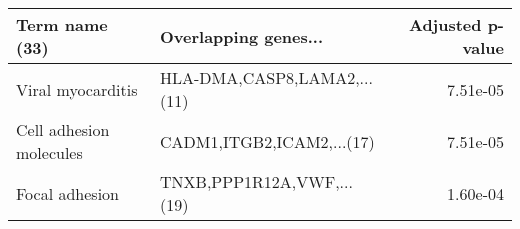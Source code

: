 \begin{tabular}{llr}
\toprule
         Term name (33) &        Overlapping genes... &  Adjusted p-value \\
\midrule
      Viral myocarditis & HLA-DMA,CASP8,LAMA2,...(11) &          7.51e-05 \\
Cell adhesion molecules &   CADM1,ITGB2,ICAM2,...(17) &          7.51e-05 \\
         Focal adhesion &   TNXB,PPP1R12A,VWF,...(19) &          1.60e-04 \\
\bottomrule
\end{tabular}

